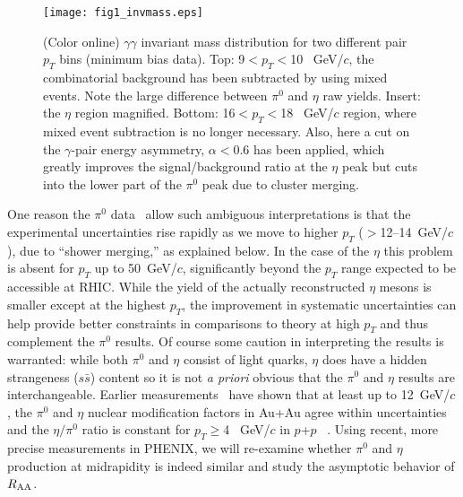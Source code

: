 \documentclass[aps,prc,superscriptaddress,showpacs,nofootinbib,floatfix,twocolumn]{revtex4}
\def\pt{$p_T$}
\def\pts{$p_T$ }
\def\gevc{~GeV/$c$}
\def\gevcs{~GeV/$c$ }
\def\raa{$R_{\rm AA}$}
\def\pp{$p$+$p$ }
\def\pizs{$\pi^{0}$ }
\def\hs{$\eta$ }
\begin{document}
\begin{figure}[tbh]
\texttt{[image: fig1\_invmass.eps]}
\caption{\label{fig:fig1_invmass} (Color online) 
  $\gamma\gamma$ invariant mass distribution for two different pair 
  \pts bins  (minimum bias data).
  Top: 9$<$\pt$<$10 \gevc, the combinatorial background has been subtracted
  by using mixed events.  Note the large difference between \pizs and
  \hs raw yields.  Insert: the \hs region magnified.  
  Bottom: 16$<$\pt$<$18 \gevcs region, where mixed event subtraction
  is no longer necessary.  Also, here a cut on the $\gamma$-pair energy
  asymmetry, $\alpha<0.6$ has been applied, which greatly improves the
  signal/background ratio at the
  \hs peak but cuts into the lower part of the \pizs peak due to
  cluster merging.  
}
\end{figure}

One reason the \pizs data~\cite{ppg080} allow such ambiguous 
interpretations is that the experimental uncertainties rise rapidly as 
we move to higher \pts ($>$12--14\gevc), due to ``shower merging,'' as 
explained below.  In the case of the \hs this problem is absent for 
\pts up to 50\gevc, significantly beyond the \pts range expected to be 
accessible at RHIC.  While the yield of the actually reconstructed \hs 
mesons is smaller except at the highest \pt, the improvement in 
systematic uncertainties can help provide better constraints in 
comparisons to theory at high \pts and thus complement the \pizs 
results.  Of course some caution in interpreting the results is 
warranted: while both \pizs and \hs consist of light quarks, \hs does 
have a hidden strangeness ($s\bar{s}$) content so it is not {\it a 
priori} obvious that the \pizs and \hs results are interchangeable.  
Earlier measurements~\cite{ppg055} have shown that at least up to 
12\gevc, the \pizs and \hs nuclear modification factors in Au+Au agree 
within uncertainties and the $\eta/\pi^0$ ratio is constant for 
\pt$\geq$4 \gevcs in \pp~\cite{ppg055}.  Using recent, more precise 
measurements in PHENIX, we will re-examine whether \pizs and \hs 
production at midrapidity is indeed similar and study the asymptotic 
behavior of \raa.


\end{document}
